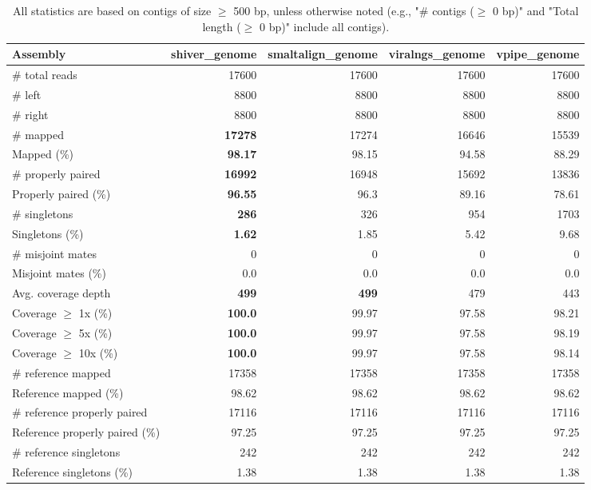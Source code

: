 \documentclass[12pt,a4paper]{article}
\begin{document}
\begin{table}[ht]
\begin{center}
\caption{All statistics are based on contigs of size $\geq$ 500 bp, unless otherwise noted (e.g., "\# contigs ($\geq$ 0 bp)" and "Total length ($\geq$ 0 bp)" include all contigs).}
\begin{tabular}{|l*{4}{|r}|}
\hline
Assembly & shiver\_genome & smaltalign\_genome & viralngs\_genome & vpipe\_genome \\ \hline
\# total reads & 17600 & 17600 & 17600 & 17600 \\ \hline
\# left & 8800 & 8800 & 8800 & 8800 \\ \hline
\# right & 8800 & 8800 & 8800 & 8800 \\ \hline
\# mapped & {\bf 17278} & 17274 & 16646 & 15539 \\ \hline
Mapped (\%) & {\bf 98.17} & 98.15 & 94.58 & 88.29 \\ \hline
\# properly paired & {\bf 16992} & 16948 & 15692 & 13836 \\ \hline
Properly paired (\%) & {\bf 96.55} & 96.3 & 89.16 & 78.61 \\ \hline
\# singletons & {\bf 286} & 326 & 954 & 1703 \\ \hline
Singletons (\%) & {\bf 1.62} & 1.85 & 5.42 & 9.68 \\ \hline
\# misjoint mates & 0 & 0 & 0 & 0 \\ \hline
Misjoint mates (\%) & 0.0 & 0.0 & 0.0 & 0.0 \\ \hline
Avg. coverage depth & {\bf 499} & {\bf 499} & 479 & 443 \\ \hline
Coverage $\geq$ 1x (\%) & {\bf 100.0} & 99.97 & 97.58 & 98.21 \\ \hline
Coverage $\geq$ 5x (\%) & {\bf 100.0} & 99.97 & 97.58 & 98.19 \\ \hline
Coverage $\geq$ 10x (\%) & {\bf 100.0} & 99.97 & 97.58 & 98.14 \\ \hline
\# reference mapped & 17358 & 17358 & 17358 & 17358 \\ \hline
Reference mapped (\%) & 98.62 & 98.62 & 98.62 & 98.62 \\ \hline
\# reference properly paired & 17116 & 17116 & 17116 & 17116 \\ \hline
Reference properly paired (\%) & 97.25 & 97.25 & 97.25 & 97.25 \\ \hline
\# reference singletons & 242 & 242 & 242 & 242 \\ \hline
Reference singletons (\%) & 1.38 & 1.38 & 1.38 & 1.38 \\ \hline

\end{tabular}
\end{center}
\end{table}
\end{document}
